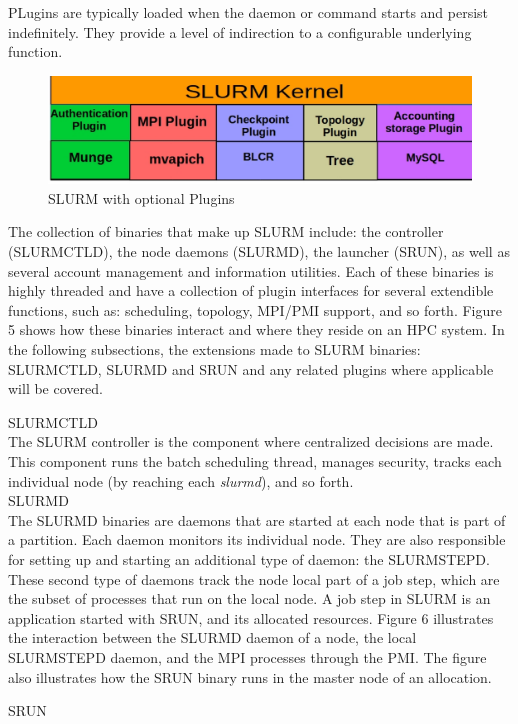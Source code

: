 PLugins are typically loaded when the daemon or command starts and persist indefinitely. They provide a level of indirection to a configurable underlying function.
\begin{figure}[h]
\centering
\includegraphics[width=1.0\textwidth]{./figures/plugin.eps}
\vspace{-0.15in}
\caption{SLURM with optional Plugins}
\label{fig:6}
\end{figure}

The collection of binaries that make up SLURM include: the controller (SLURMCTLD), the node daemons (SLURMD), the launcher (SRUN), as well as several account management and information utilities. Each of these binaries is highly threaded and have a collection of plugin interfaces for several extendible functions, such as: scheduling, topology, MPI/PMI support, and so forth. Figure 5 shows how these binaries interact and where they reside on an HPC system. In the following subsections, the extensions made to SLURM binaries: SLURMCTLD, SLURMD and SRUN and any related plugins where applicable will be covered.\par
SLURMCTLD\\
The SLURM controller is the component where centralized decisions are made. This component runs the batch scheduling thread, manages security, tracks each individual node (by reaching each \textit{slurmd}), and so forth.\\
SLURMD\\
The SLURMD binaries are daemons that are started at each node that is part of a partition. Each daemon monitors its individual node. They are also responsible for setting up and starting an additional type of daemon: the SLURMSTEPD. These second type of daemons track the node local part of a job step, which are the subset of processes that run on the local node. A job step in SLURM is an application started with SRUN, and its allocated resources. Figure 6 illustrates the interaction between the SLURMD daemon of a node, the local SLURMSTEPD daemon, and the MPI processes through the PMI. The figure also illustrates how the SRUN binary runs in the master node of an allocation.\par
SRUN\\


